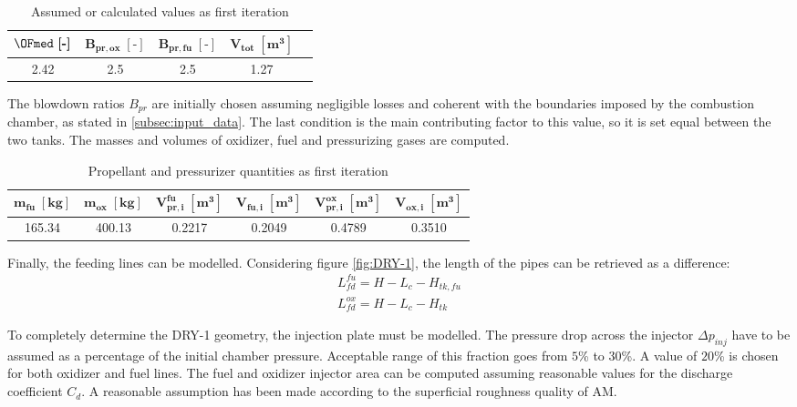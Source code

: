\begin{table}[H]
    \renewcommand{\arraystretch}{1.4}
    \centering
    \begin{tabular}{|c|c|c|c|c|}
        \hline
        $\boldsymbol{\OFmed \; [\textbf{-}]}$ & $\boldsymbol{B_{pr,ox} \; [\textbf{-}]}$ & $\boldsymbol{B_{pr,fu} \; [\textbf{-}]}$  & $\boldsymbol{V_{tot} \; [\textbf{m}^3]}$ \\
        \hline
        \hline
        2.42 & 2.5 & 2.5 & 1.27 \\
        \hline
    \end{tabular}
    \caption{Assumed or calculated values as first iteration}
    \label{table:fata_turchina_valori_assunti}
\end{table}

The blowdown ratios $B_{pr}$ are initially chosen assuming negligible losses and coherent with the boundaries imposed by the combustion chamber, as stated in \autoref{subsec:input_data}. The last condition is the main contributing factor to this value, so it is set equal between the two tanks.
The masses and volumes of oxidizer, fuel and pressurizing gases are computed.

\begin{table}[H]
    \renewcommand{\arraystretch}{1.5}
    \centering
    \begin{tabular}{|c|c|c|c|c|c|}
        \hline
        $\boldsymbol{m_{fu} \; [\textbf{kg}]}$ & $\boldsymbol{m_{ox} \; [\textbf{kg}]}$ & $\boldsymbol{V_{pr, i}^{fu} \; [\textbf{m}^3]}$ & $\boldsymbol{V_{fu, i} \; [\textbf{m}^3]}$ & $\boldsymbol{V_{pr, i}^{ox} \; [\textbf{m}^3]}$ &  $\boldsymbol{V_{ox, i} \; [\textbf{m}^3]}$\\
        \hline
        \hline
        165.34 & 400.13 & 0.2217 & 0.2049 & 0.4789 & 0.3510 \\
        \hline
    \end{tabular}
    \caption{Propellant and pressurizer quantities as first iteration}
    \label{table:soluzioni_fata_turchina}
\end{table}


Finally, the feeding lines can be modelled. Considering figure \autoref{fig:DRY-1}, the length of the pipes can be retrieved as a difference:
\begin{gather}
    L_{fd}^{fu} = H - L_c - H_{tk,fu} \\
    L_{fd}^{ox} = H - L_c - H_{tk}
\end{gather}

To completely determine the DRY-1 geometry, the injection plate must be modelled. The pressure drop across the injector $\Delta p_{inj}$ have to be assumed as a percentage of the initial chamber pressure. Acceptable range of this fraction goes from $5$\% to $30$\%. A value of $20$\% is chosen for both oxidizer and fuel lines. The fuel and oxidizer injector area can be computed assuming reasonable values for the discharge coefficient $C_d$. A reasonable assumption has been made according to the superficial roughness quality of AM.

